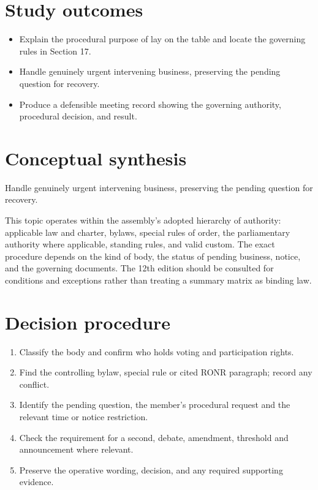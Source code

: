 \documentclass[11pt]{article}
\begin{document}
\SuiteOpen
{}
\section{Study outcomes}
\begin{itemize}[leftmargin=*,itemsep=4pt]
\item Explain the procedural purpose of lay on the table and locate the governing rules in Section 17.
\item Handle genuinely urgent intervening business, preserving the pending question for recovery.
\item Produce a defensible meeting record showing the governing authority, procedural decision, and result.
\end{itemize}

\section{Conceptual synthesis}
Handle genuinely urgent intervening business, preserving the pending question for recovery.

This topic operates within the assembly’s adopted hierarchy of authority: applicable law and charter, bylaws, special rules of order, the parliamentary authority where applicable, standing rules, and valid custom. The exact procedure depends on the kind of body, the status of pending business, notice, and the governing documents. The 12th edition should be consulted for conditions and exceptions rather than treating a summary matrix as binding law.
\section{Decision procedure}
\begin{enumerate}[leftmargin=*,itemsep=4pt]
\item Classify the body and confirm who holds voting and participation rights.
\item Find the controlling bylaw, special rule or cited RONR paragraph; record any conflict.
\item Identify the pending question, the member’s procedural request and the relevant time or notice restriction.
\item Check the requirement for a second, debate, amendment, threshold and announcement where relevant.
\item Preserve the operative wording, decision, and any required supporting evidence.
\end{enumerate}
\end{document}
